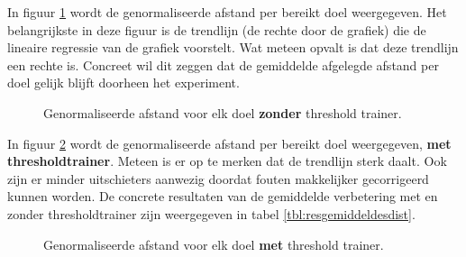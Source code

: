 \documentclass{article}
\newcommand{\figwidth}{0.82\linewidth}
\begin{document}
In figuur \ref{fig:resdistnt} wordt de genormaliseerde afstand per bereikt doel weergegeven. Het belangrijkste in deze figuur is de trendlijn (de rechte door de grafiek) die de lineaire regressie van de grafiek voorstelt. Wat meteen opvalt is dat deze trendlijn een rechte is. Concreet wil dit zeggen dat de gemiddelde afgelegde afstand per doel gelijk blijft doorheen het experiment.\\
\begin{figure}[H]
	\centering
	\caption{Genormaliseerde afstand voor elk doel \textbf{zonder} threshold trainer.}
	\label{fig:resdistnt}
\end{figure}
In figuur \ref{fig:resdistwt} wordt de genormaliseerde afstand per bereikt doel weergegeven, \textbf{met thresholdtrainer}. Meteen is er op te merken dat de trendlijn sterk daalt. Ook zijn er minder uitschieters aanwezig doordat fouten makkelijker gecorrigeerd kunnen worden. De concrete resultaten van de gemiddelde verbetering met en zonder thresholdtrainer zijn weergegeven in tabel \ref{tbl:resgemiddeldesdist}.
\begin{figure}[H]
	\centering
	\caption{Genormaliseerde afstand voor elk doel \textbf{met} threshold trainer.}
	\label{fig:resdistwt}
	
\end{figure}
\end{document}
